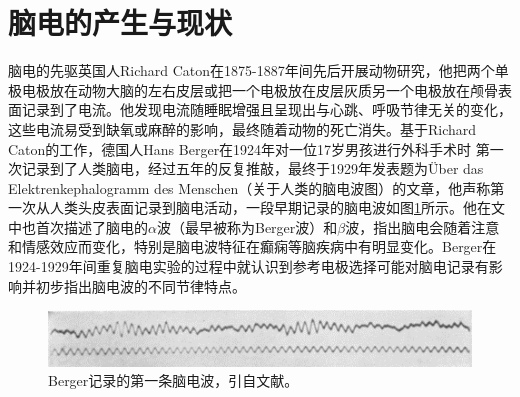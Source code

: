 \thesischapterexordium
\section{脑电的产生与现状}
脑电的先驱英国人Richard Caton在1875-1887年间先后开展动物研究，他把两个单极电极放在动物大脑的左右皮层或把一个电极放在皮层灰质另一个电极放在颅骨表面记录到了电流。他发现电流随睡眠增强且呈现出与心跳、呼吸节律无关的变化，这些电流易受到缺氧或麻醉的影响，最终随着动物的死亡消失。基于Richard Caton的工作，德国人Hans Berger在1924年对一位17岁男孩进行外科手术时
第一次记录到了人类脑电，经过五年的反复推敲，最终于1929年发表题为Über das Elektrenkephalogramm des Menschen（关于人类的脑电波图）的文章，他声称第一次从人类头皮表面记录到脑电活动，一段早期记录的脑电波如图\ref{1:wave}所示。他在文中也首次描述了脑电的$\alpha$波（最早被称为Berger波）和$\beta$波，指出脑电会随着注意和情感效应而变化，特别是脑电波特征在癫痫等脑疾病中有明显变化。Berger在1924-1929年间重复脑电实验的过程中就认识到参考电极选择可能对脑电记录有影响并初步指出脑电波的不同节律特点。
\begin{figure}[!h]
	\includegraphics[width=13cm]{pic/xulun/EEGwave.png}
	\caption{Berger记录的第一条脑电波，引自文献。}
	\label{1:wave}
\end{figure}

